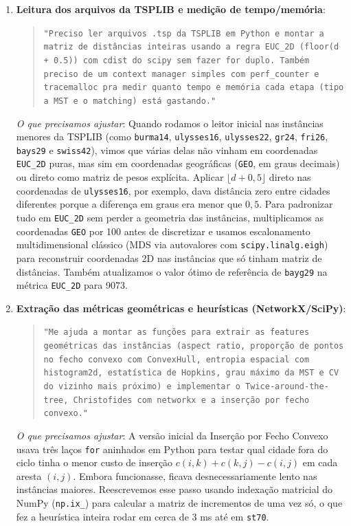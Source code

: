 \documentclass[12pt]{article}
\begin{document}
\begin{enumerate}
  \item \textbf{Leitura dos arquivos da TSPLIB e medição de tempo/memória}:
  \begin{quote}
  \small\texttt{"Preciso ler arquivos .tsp da TSPLIB em Python e montar a matriz de distâncias inteiras usando a regra EUC\_2D (floor(d + 0.5)) com cdist do scipy sem fazer for duplo. Também preciso de um context manager simples com perf\_counter e tracemalloc pra medir quanto tempo e memória cada etapa (tipo a MST e o matching) está gastando."}
  \end{quote}
  \textit{O que precisamos ajustar}: Quando rodamos o leitor inicial nas instâncias menores da TSPLIB (como \texttt{burma14}, \texttt{ulysses16}, \texttt{ulysses22}, \texttt{gr24}, \texttt{fri26}, \texttt{bays29} e \texttt{swiss42}), vimos que várias delas não vinham em coordenadas \texttt{EUC\_2D} puras, mas sim em coordenadas geográficas (\texttt{GEO}, em graus decimais) ou direto como matriz de pesos explícita. Aplicar $\lfloor d + 0,5 \rfloor$ direto nas coordenadas de \texttt{ulysses16}, por exemplo, dava distância zero entre cidades diferentes porque a diferença em graus era menor que $0,5$. Para padronizar tudo em \texttt{EUC\_2D} sem perder a geometria das instâncias, multiplicamos as coordenadas \texttt{GEO} por 100 antes de discretizar e usamos escalonamento multidimensional clássico (MDS via autovalores com \texttt{scipy.linalg.eigh}) para reconstruir coordenadas 2D nas instâncias que só tinham matriz de distâncias. Também atualizamos o valor ótimo de referência de \texttt{bayg29} na métrica \texttt{EUC\_2D} para 9073.

  \item \textbf{Extração das métricas geométricas e heurísticas (NetworkX/SciPy)}:
  \begin{quote}
  \small\texttt{"Me ajuda a montar as funções para extrair as features geométricas das instâncias (aspect ratio, proporção de pontos no fecho convexo com ConvexHull, entropia espacial com histogram2d, estatística de Hopkins, grau máximo da MST e CV do vizinho mais próximo) e implementar o Twice-around-the-tree, Christofides com networkx e a inserção por fecho convexo."}
  \end{quote}
  \textit{O que precisamos ajustar}: A versão inicial da Inserção por Fecho Convexo usava três laços \texttt{for} aninhados em Python para testar qual cidade fora do ciclo tinha o menor custo de inserção $c(i,k) + c(k,j) - c(i,j)$ em cada aresta $(i,j)$. Embora funcionasse, ficava desnecessariamente lento nas instâncias maiores. Reescrevemos esse passo usando indexação matricial do NumPy (\texttt{np.ix\_}) para calcular a matriz de incrementos de uma vez só, o que fez a heurística inteira rodar em cerca de 3 ms até em \texttt{st70}.


\end{enumerate}
\end{document}
